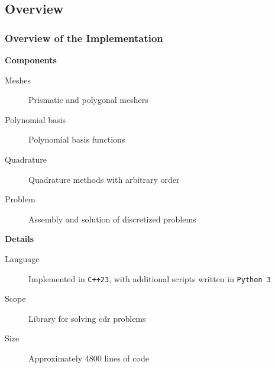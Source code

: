 \subsection{Overview}

\begin{frame}
    \frametitle{Overview of the Implementation}

    \begin{multicols}{2}

        \begin{center}
            {\color{\accentcolor} \Large \textbf{Components}}
            \vspace*{0.5cm}

            \begin{minipage}{0.4\textwidth}
                \begin{description}
                    \item[Meshes] Prismatic and polygonal meshers
                    \item[Polynomial basis] Polynomial basis functions
                    \item[Quadrature] Quadrature methods with arbitrary order
                    \item[Problem] Assembly and solution of discretized problems
                \end{description}
            \end{minipage}
        \end{center}

        \vfill\null
        \columnbreak

        \begin{center}
            {\color{\accentcolor} \Large \textbf{Details}}
            \vspace*{0.5cm}

            \begin{minipage}{0.4\textwidth}
                \begin{description}
                    \item[Language] Implemented in \lstinline{C++23}, with additional scripts written in \lstinline{Python 3}
                    \item[Scope] Library for solving \acrshort{cdr} problems
                    \item[Size] Approximately 4800 lines of code
                \end{description}
            \end{minipage}
        \end{center}
    \end{multicols}
    
\end{frame}

